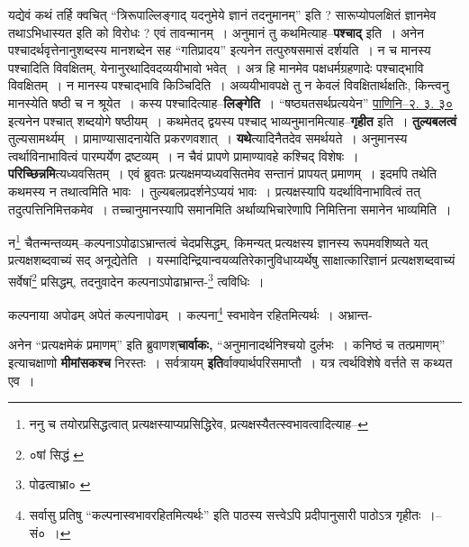 \documentclass[article,12pt,a4paper]{memoir}
\begin{document}
	  \pstart यद्येवं कथं तर्हि क्वचित् “त्रिरूपाल्लिङ्गाद् यदनुमेये ज्ञानं तदनुमानम्” इति ? सारूप्योपलक्षितं ज्ञानमेव तथाऽभिधास्यत इति को विरोधः ? एवं तावन्मानम् । अनुमानं तु कथमित्याह--\textbf{पश्चाद्} इति । अनेन पश्चादर्थवृत्तेनानुशब्दस्य मानशब्देन सह “गतिप्रादय” इत्यनेन तत्पुरुषसमासं दर्शयति । न च मानस्य पश्चादिति \leavevmode{} विवक्षितम्, येनानुरथादिवदव्ययीभावो भवेत् । अत्र हि मानमेव पक्षधर्मग्रहणादेः पश्चाद्भावि विवक्षितम् । न मानस्य पश्चाद्भावि किञ्चिदिति । अव्ययीभावपक्षे तु न केवलं विवक्षितार्थक्षतिः, किन्त्वनु मानस्येति षष्ठी च न श्रूयेत । कस्य पश्चादित्याह--\textbf{लिङ्गेति} । “षष्ठ्यतसर्थप्रत्ययेन” \href{http://http://sarit.indology.info/?cref=Pā.2.3.30}{पाणिनि--२. ३. ३०} इत्यनेन पश्चात् शब्दयोगे षष्ठीयम् । कथमेतद् द्वयस्य पश्चाद् भाव्यनुमानमित्याह--\textbf{गृहीत} इति । \textbf{तुल्यबलत्वं} तुल्यसामर्थ्यम् । प्रामाण्यासादनायेति प्रकरणवशात् । \textbf{यथे}त्यादिनैतदेव समर्थयते । अनुमानस्य त्वर्थाविनाभावित्वं पारम्पर्येण द्रष्टव्यम् । न चैवं प्रापणे प्रामाण्यावहे कश्चिद् विशेषः । \textbf{परिच्छिन्नमि}त्यध्यवसितम् । एवं ब्रुवतः प्रत्यक्षमप्यध्यवसितमेव सन्तानं प्रापयत् प्रमाणम् । इदमपि तथेति कथमस्य न तथात्वमिति भावः । तुल्यबलप्रदर्शनेऽप्ययं भावः । प्रत्यक्षस्यापि यदर्थाविनाभावित्वं तत् तदुत्पत्तिनिमित्तकमेव । तच्चानुमानस्यापि समानमिति अर्थाव्यभिचारेणापि निमित्तिना समानेन भाव्यमिति ।
	\pend
      \leavevmode{}
	  \bigskip
	  \begingroup
	

	  \pstart न\footnote{ननु च तयोरप्रसिद्धत्वात् प्रत्यक्षस्याप्यप्रसिद्धिरेव, प्रत्यक्षस्यैतत्स्वभावत्वादित्याह--\cite{dp-msD-n}} चैतन्मन्तव्यम्--कल्पनाऽपोढाऽभ्रान्तत्वं चेदप्रसिद्धम्, किमन्यत् प्रत्यक्षस्य ज्ञानस्य रूपमवशिष्यते यत् प्रत्यक्षशब्दवाच्यं सद् अनूद्येतेति । यस्मादिन्द्रियान्वयव्यतिरेकानुविधाय्यर्थेषु साक्षात्कारिज्ञानं प्रत्यक्षशब्दवाच्यं सर्वेषां\footnote{०षां सिद्धं \cite{dp-msA} \cite{dp-msC} \cite{dp-edP} \cite{dp-edH} \cite{dp-edE}} प्रसिद्धम्, तदनुवादेन कल्पनाऽपोढाभ्रान्त-\footnote{पोढत्वाभ्रा० \cite{dp-msC} \cite{dp-msD}} त्वविधिः ।
	\pend
       

	  \pstart कल्पनाया अपोढम् अपेतं कल्पनापोढम् । कल्पना\footnote{सर्वासु प्रतिषु “कल्पनास्वभावरहितमित्यर्थः” इति पाठस्य सत्त्वेऽपि प्रदीपानुसारी पाठोऽत्र गृहीतः ।--सं० ।} स्वभावेन रहितमित्यर्थः । अभ्रान्त-
	\pend
      
	  \endgroup
	

	  \pstart अनेन “प्रत्यक्षमेकं प्रमाणम्” इति ब्रुवाणश्\textbf{चार्वाकः,} “अनुमानादर्थनिश्चयो दुर्लभः । कनिष्ठं च तत्प्रमाणम्” इत्याचक्षाणो \textbf{मीमांसकश्च} निरस्तः । सर्वत्रायम् \textbf{इति}र्वाक्यार्थपरिसमाप्तौ । यत्र त्वर्थविशेषे वर्त्तते स कथ्यत एव ।
	\pend
      
\end{document}
